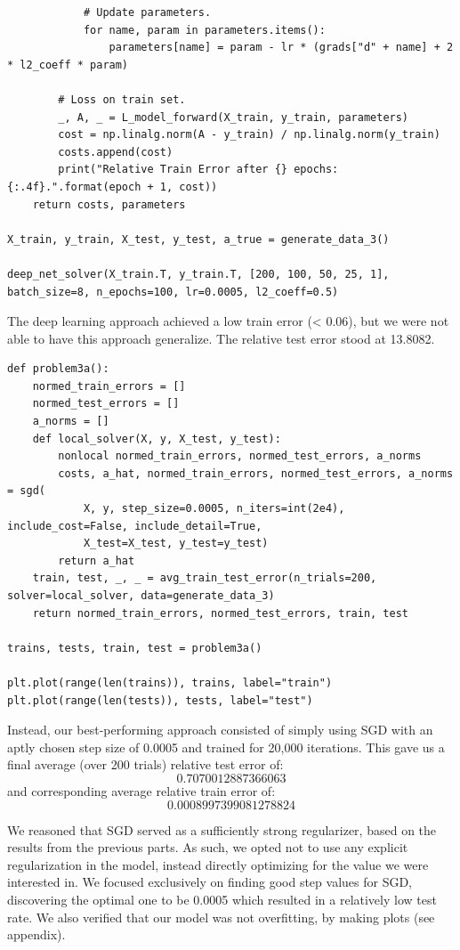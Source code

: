 \documentclass[12pt]{article}
\begin{document}
\begin{enumerate}[label=(\alph*)]
\begin{verbatim}
            # Update parameters.
            for name, param in parameters.items():
                parameters[name] = param - lr * (grads["d" + name] + 2 * l2_coeff * param)
    
        # Loss on train set.
        _, A, _ = L_model_forward(X_train, y_train, parameters)
        cost = np.linalg.norm(A - y_train) / np.linalg.norm(y_train)
        costs.append(cost)
        print("Relative Train Error after {} epochs: {:.4f}.".format(epoch + 1, cost))
    return costs, parameters

X_train, y_train, X_test, y_test, a_true = generate_data_3()

deep_net_solver(X_train.T, y_train.T, [200, 100, 50, 25, 1], batch_size=8, n_epochs=100, lr=0.0005, l2_coeff=0.5)
    \end{verbatim}

    The deep learning approach achieved a low train error (< 0.06), but we were not able to have this approach generalize. The relative test error stood at 13.8082.
    \begin{verbatim}
def problem3a():
    normed_train_errors = []
    normed_test_errors = []
    a_norms = []
    def local_solver(X, y, X_test, y_test):
        nonlocal normed_train_errors, normed_test_errors, a_norms
        costs, a_hat, normed_train_errors, normed_test_errors, a_norms = sgd(
            X, y, step_size=0.0005, n_iters=int(2e4), include_cost=False, include_detail=True,
            X_test=X_test, y_test=y_test)
        return a_hat
    train, test, _, _ = avg_train_test_error(n_trials=200, solver=local_solver, data=generate_data_3)
    return normed_train_errors, normed_test_errors, train, test

trains, tests, train, test = problem3a()

plt.plot(range(len(trains)), trains, label="train")
plt.plot(range(len(tests)), tests, label="test")
    \end{verbatim}

    Instead, our best-performing approach consisted of simply using SGD with an aptly chosen step size of 0.0005 and trained for 20,000 iterations. This gave us a final average (over 200 trials) relative test error of:
    \[
      0.7070012887366063
    \]
    and corresponding average relative train error of:
    \[
      0.0008997399081278824
    \]

    We reasoned that SGD served as a sufficiently strong regularizer, based on the results from the previous parts. As such, we opted not to use any explicit regularization in the model, instead directly optimizing for the value we were interested in. We focused exclusively on finding good step values for SGD, discovering the optimal one to be 0.0005 which resulted in a relatively low test rate. We also verified that our model was not overfitting, by making plots (see appendix).


\end{enumerate}
\end{document}
